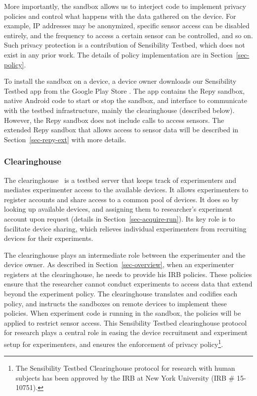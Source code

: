 More importantly, the sandbox allows us to interject
code to implement privacy policies and control what happens with
the data gathered on the device. 
For example, IP addresses may be anonymized, 
specific sensor access can be disabled entirely, and the frequency to 
access a certain sensor can be controlled, and so on. Such privacy
protection is a contribution of Sensibility Testbed, which does
not exist in any prior work. The details of policy implementation 
are in Section~\ref{sec-policy}.

To install the sandbox on a device, a device owner downloads 
our Sensibility Testbed app from the Google Play Store \cite{sensibility-app}.
The app contains the Repy sandbox, native Android code to 
start or stop the sandbox, and interface to communicate with the testbed 
infrastructure, mainly the clearinghouse (described below). 
However, the Repy sandbox does not include calls to access sensors. 
The extended Repy sandbox that allows access to sensor 
data will be described in Section~\ref{sec-repy-ext} with more details.

\subsubsection{Clearinghouse}\label{sec-ch}
The clearinghouse~\cite{ch} is a testbed server that keeps track of 
experimenters and mediates experimenter access to the 
available devices. It allows experimenters to register 
accounts and share access to a common pool of devices.
It does so by looking up available devices, and assigning
them to researcher's experiment account upon request 
(details in Section~\ref{sec-acquire-run}). 
Its key role is to facilitate device sharing, 
which relieves individual experimenters from recruiting 
devices for their experiments.

The clearinghouse
plays an intermediate role between the experimenter and 
the device owner.
As described in Section~\ref{sec-overview}, when an 
experimenter registers at the clearinghouse, he
needs to provide his IRB policies. These policies ensure that
the researcher cannot conduct experiments to access data that
extend beyond the experiment policy. The clearinghouse 
translates and codifies each policy, and instructs the 
sandboxes on remote devices to implement these policies. 
When experiment code is running in the sandbox, the 
policies will be applied to restrict %
sensor access. This Sensibility Testbed
clearinghouse protocol for research plays a central role in
easing the device recruitment and experiment setup for experimenters, 
and ensures the enforcement
of privacy policy\footnote{\scriptsize The Sensibility Testbed Clearinghouse
protocol for research with human subjects has been approved by
the IRB at New York University (IRB \# 15-10751).}. 

